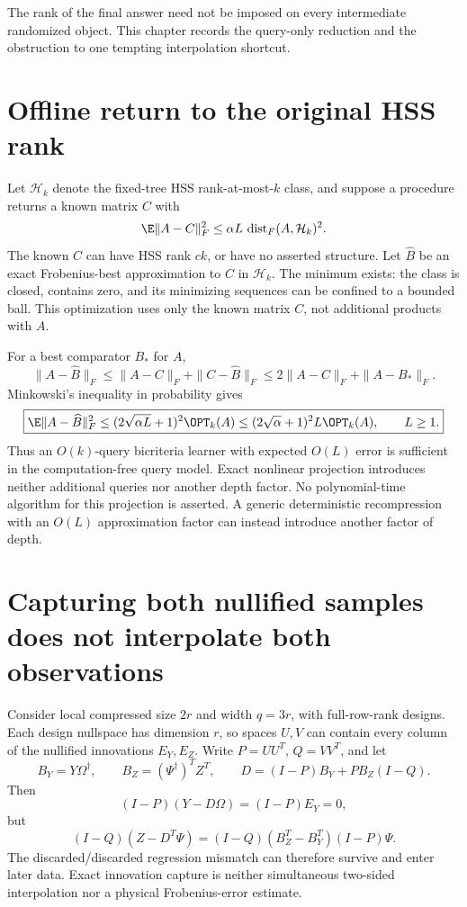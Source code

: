\documentclass[11pt,oneside,openany,a4paper]{book}
\numberwithin{equation}{chapter}
\theoremstyle{definition}
\theoremstyle{remark}
\begin{document}
The rank of the final answer need not be imposed on every intermediate randomized object. This chapter records the query-only reduction and the obstruction to one tempting interpolation shortcut.

\section{Offline return to the original HSS rank}
Let $\mathcal H_k$ denote the fixed-tree HSS rank-at-most-$k$ class, and suppose a procedure returns a known matrix $C$ with
\[
 \E\|A-C\|_F^2\le\alpha L\,\operatorname{dist}_F(A,\mathcal H_k)^2.
\]
The known $C$ can have HSS rank $ck$, or have no asserted structure. Let $\widehat B$ be an exact Frobenius-best approximation to $C$ in $\mathcal H_k$. The minimum exists: the class is closed, contains zero, and its minimizing sequences can be confined to a bounded ball. This optimization uses only the known matrix $C$, not additional products with $A$.

For a best comparator $B_*$ for $A$,
\[
 \|A-\widehat B\|_F
 \le\|A-C\|_F+\|C-\widehat B\|_F
 \le2\|A-C\|_F+\|A-B_*\|_F.
\]
Minkowski's inequality in probability gives
\begin{equation}\label{bicriteria:eq:projection}
 \boxed{\E\|A-\widehat B\|_F^2
 \le(2\sqrt{\alpha L}+1)^2\OPT_k(A)
 \le(2\sqrt\alpha+1)^2L\OPT_k(A),\qquad L\ge1.}
\end{equation}
Thus an $O(k)$-query bicriteria learner with expected $O(L)$ error is sufficient in the computation-free query model. Exact nonlinear projection introduces neither additional queries nor another depth factor. No polynomial-time algorithm for this projection is asserted. A generic deterministic recompression with an $O(L)$ approximation factor can instead introduce another factor of depth.

\section{Capturing both nullified samples does not interpolate both observations}
Consider local compressed size $2r$ and width $q=3r$, with full-row-rank designs. Each design nullspace has dimension $r$, so spaces $U,V$ can contain every column of the nullified innovations $E_Y,E_Z$. Write $P=UU^T$, $Q=VV^T$, and let
\[
 B_Y=Y\Omega^\dagger,\qquad
 B_Z=(\Psi^\dagger)^TZ^T,\qquad
 D=(I-P)B_Y+PB_Z(I-Q).
\]
Then
\[
 (I-P)(Y-D\Omega)=(I-P)E_Y=0,
\]
but
\begin{equation}\label{bicriteria:eq:mismatch}
 (I-Q)(Z-D^T\Psi)
 =(I-Q)(B_Z^T-B_Y^T)(I-P)\Psi.
\end{equation}
The discarded/discarded regression mismatch can therefore survive and enter later data. Exact innovation capture is neither simultaneous two-sided interpolation nor a physical Frobenius-error estimate.
\end{document}
